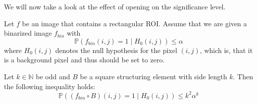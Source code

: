 \documentclass{beamer}
\begin{document}
\begin{frame}
	We will now take a look at the effect of opening on the significance level.
	
	\begin{theorem}
		Let $f$ be an image that contains a rectangular ROI. Assume that we are given a binarized image $f_{bin}$ with
		\begin{equation*}
			\mathbb{P}(f_{bin}(i, j) = 1 \mid H_0(i, j)) \leq \alpha
		\end{equation*}
		where $H_0(i, j)$ denotes the null hypothesis for the pixel $(i, j)$, which is, that it is a background pixel and thus should be set to zero.
		
		Let $k \in \mathbb{N}$ be odd and $B$ be a square structuring element with side length $k$. Then the following inequality holds:
		\begin{equation*}
			\mathbb{P}((f_{bin} \circ B)(i, j) = 1 \mid H_0(i, j)) \leq k^2 \alpha^k
		\end{equation*}
	\end{theorem}
\end{frame}
\end{document}
